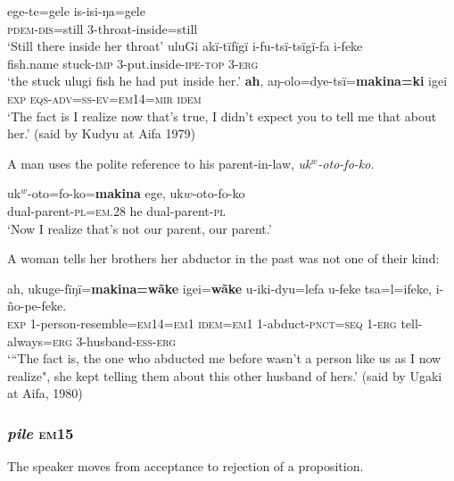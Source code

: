 \documentclass[output=paper]{langsci/langscibook}
\begin{document}
\begin{exe}
\ex \label{ex:eb35}
	\begin{xlist}
	\ex \label{ex:eb35a}
	\gll ege-te=gele is-isi-ŋa=gele\\
	\textsc{pdem-dis}=still 3-throat-inside=still\\
	\trans ‘Still there inside her throat’
	\ex \label{ex:eb35b}
	\gll uluGi akï-tïfïgï i-fu-tsï-tsïgï-fa i-feke\\
	{fish.name} stuck-\textsc{imp} 3-put.inside-\textsc{ipe-top} 3-\textsc{erg}\\
	\trans ‘the stuck ulugi fish he had put inside her.’
	\ex \label{ex:eb35c}
	\gll \textbf{ah}, aŋ-olo=dye-tsï=\textbf{makina=ki} igei\\ %
	\textsc{exp} \textsc{eqs-adv=ss-ev=em14=mir} \textsc{idem}\\
	\trans ‘The fact is I realize now that’s true,  I didn’t expect you to tell me that about her.’ (said by Kudyu at Aifa 1979)
\end{xlist}
\end{exe}

A man uses the polite reference to his parent-in-law, \textit{uk$^w$-oto-fo-ko}. 

\begin{exe}
	\ex \label{ex:eb36}
	\gll uk$^w$-oto=fo-ko=\textbf{makina} ege, uk$w$-oto-fo-ko\\
	dual-parent-\textsc{pl=em.28} he dual-parent-\textsc{pl}\\
	\trans ‘Now I realize that’s not our parent, our parent.’
\end{exe}

A woman tells her brothers her abductor in the past was not one of their kind:

\begin{exe}
	\ex \label{ex:eb37}
	\gll ah, ukuge-fïŋï=\textbf{makina=wãke} igei=\textbf{wãke} u-iki-dyu=lefa u-feke tsa=l=ifeke, i-ño-pe-feke.\\
	\textsc{exp} 1-person-resemble=\textsc{em}14=\textsc{em}1   \textsc{idem}=\textsc{em}1 1-abduct-\textsc{pnct=seq}     1-\textsc{erg}   tell-always=\textsc{erg}  3-husband-\textsc{ess-erg}\\
	\trans ‘“The fact is, the one who abducted me before wasn’t a person like us as I now realize", she kept telling them about this other husband of hers.’ (said by Ugaki at Aifa, 1980)
\end{exe}


\subsubsection{\textit{pile} \textsc{em}15}  The speaker moves from acceptance to rejection of a proposition.
\end{document}

